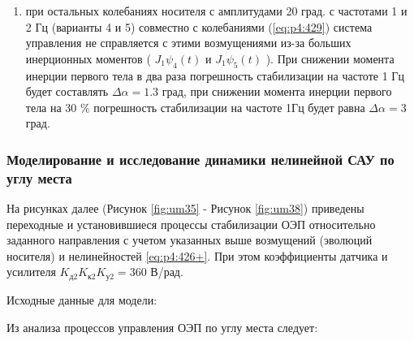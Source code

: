 \begin{enumerate}
	
	\item при остальных колебаниях носителя с амплитудами 20 град. с частотами 1 и  2  Гц (варианты 4 и 5) совместно с колебаниями  (\ref{eq:p4:429}) система управления не справляется с этими возмущениями из-за больших инерционных моментов ( \( J_{1} \psi _{4} \left( t \right)  \)  и  \( J_{1} \psi _{5} \left( t \right)  \) ). При снижении  момента инерции первого тела в два раза погрешность стабилизации на частоте  1 Гц будет составлять   $\varDelta\alpha=1.3$ град, при снижении момента инерции первого тела на 30 $\%$  погрешность стабилизации на частоте 1Гц будет равна $\varDelta\alpha=3$  град.
\end{enumerate}


\subsubsection{Моделирование и исследование динамики нелинейной САУ по углу места} \label{subsec:ch4/sect6/sub2}


На рисунках далее (Рисунок \ref{fig:um35} - Рисунок \ref{fig:um38}) приведены переходные и установившиеся процессы стабилизации ОЭП относительно заданного направления с учетом указанных выше возмущений (эволюций носителя) и нелинейностей \ref{eq:p4:426+}. При этом коэффициенты датчика и усилителя $K_{\textit{д2}} K_{\textit{к2}} K_{\textit{у2}} = 360$ В/рад. \par

Исходные данные для модели:

\begingroup
\captiondelim{ } %

\endgroup

Из анализа процессов управления ОЭП по углу места следует:\par

